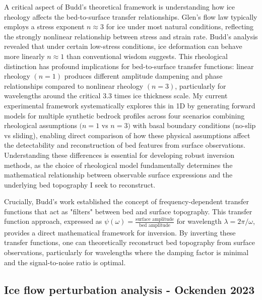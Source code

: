 A critical aspect of Budd's theoretical framework is understanding how ice rheology affects the bed-to-surface transfer relationships. Glen's flow law typically employs a stress exponent $n\approx 3$ for ice under most natural conditions, reflecting the strongly nonlinear relationship between stress and strain rate. Budd's analysis revealed that under certain low-stress conditions, ice deformation can behave more linearly $n\approx 1$ than conventional wisdom suggests. This rheological distinction has profound implications for bed-to-surface transfer functions: linear rheology $(n = 1)$ produces different amplitude dampening and phase relationships compared to nonlinear rheology $(n = 3)$, particularly for wavelengths around the critical 3.3 times ice thickness scale. My current experimental framework systematically explores this in 1D by generating forward models for multiple synthetic bedrock profiles across four scenarios combining rheological assumptions $(n = 1$ vs $n = 3)$ with basal boundary conditions (no-slip vs sliding), enabling direct comparison of how these physical assumptions affect the detectability and reconstruction of bed features from surface observations. Understanding these differences is essential for developing robust inversion methods, as the choice of rheological model fundamentally determines the mathematical relationship between observable surface expressions and the underlying bed topography I seek to reconstruct.

Crucially, Budd's work established the concept of frequency-dependent transfer functions that act as "filters" between bed and surface topography. This transfer function approach, expressed as $\psi(\omega) = \frac{\text{surface amplitude}}{\text{bed amplitude}}$ for wavelength $\lambda = 2\pi/\omega$, provides a direct mathematical framework for inversion. By inverting these transfer functions, one can theoretically reconstruct bed topography from surface observations, particularly for wavelengths where the damping factor is minimal and the signal-to-noise ratio is optimal.

\subsection{Ice flow perturbation analysis - Ockenden 2023}

